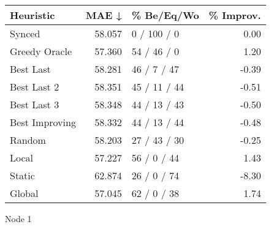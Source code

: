 \begin{tabular}{lrlr}
\toprule
\textbf{Heuristic} & \textbf{MAE ↓} & \textbf{\% Be/Eq/Wo} & \textbf{\% Improv.} \\
\midrule
            Synced &         58.057 &          0 / 100 / 0 &                0.00 \\
     Greedy Oracle &         57.360 &          54 / 46 / 0 &                1.20 \\
         Best Last &         58.281 &          46 / 7 / 47 &               -0.39 \\
       Best Last 2 &         58.351 &         45 / 11 / 44 &               -0.51 \\
       Best Last 3 &         58.348 &         44 / 13 / 43 &               -0.50 \\
    Best Improving &         58.332 &         44 / 13 / 44 &               -0.48 \\
            Random &         58.203 &         27 / 43 / 30 &               -0.25 \\
             Local &         57.227 &          56 / 0 / 44 &                1.43 \\
            Static &         62.874 &          26 / 0 / 74 &               -8.30 \\
            Global &         57.045 &          62 / 0 / 38 &                1.74 \\
\bottomrule
\end{tabular}
\caption{Node 1}
\label{tab:non_lr05_le1_bs4_1}
